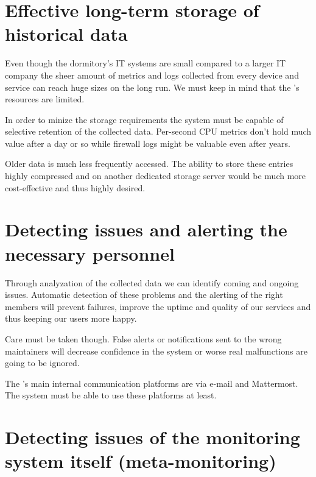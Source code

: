 \section{Effective long-term storage of historical data}

Even though the dormitory's IT systems are small compared to a larger IT
company the sheer amount of metrics and logs collected from every device and
service can reach huge sizes on the long run. We must keep in mind that the
\kszk's resources are limited.

In order to minize the storage requirements the system must be capable of
selective retention of the collected data. Per-second CPU metrics don't hold
much value after a day or so while firewall logs might be valuable even after
years.

Older data is much less frequently accessed. The ability to store these entries
highly compressed and on another dedicated storage server would be much more
cost-effective and thus highly desired.

\section{Detecting issues and alerting the necessary personnel}

Through analyzation of the collected data we can identify coming and ongoing
issues. Automatic detection of these problems and the alerting of the right
\kszk members will prevent failures, improve the uptime and quality of our
services and thus keeping our users more happy.

Care must be taken though. False alerts or notifications sent to the wrong
maintainers will decrease confidence in the system or worse real malfunctions
are going to be ignored.

The \kszk's main internal communication platforms are via e-mail and
Mattermost. The system must be able to use these platforms at least.

\section{Detecting issues of the monitoring system itself (meta-monitoring)}

